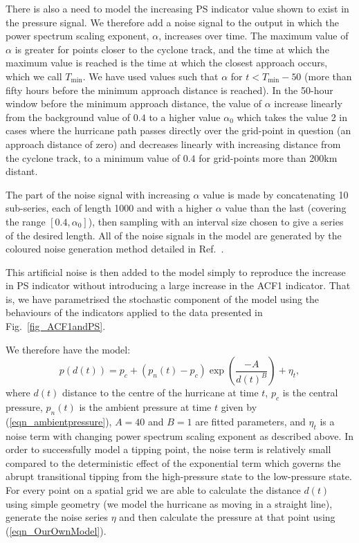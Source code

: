\documentclass[%
aip,
amsmath,amssymb,
reprint,%
]{revtex4-1}
\newcommand{\newNote}[1]{{#1}}
\begin{document}
There is also a need to model the increasing PS indicator value shown to exist in the pressure signal. We therefore add a noise signal to the output in which the power spectrum scaling exponent, $\alpha$, increases over time. The maximum value of $\alpha$ is greater for points closer to the cyclone track, and the time at which the maximum value is reached is the time at which the closest approach occurs, which we call $T_{\min}$. We have used values  {\newNote such that $\alpha$ for $t<T_{\min}-50$ (more than fifty hours before the minimum approach distance is reached). In the 50-hour window before the minimum approach distance, the value of $\alpha$ increase linearly from the background value of $0.4$ to a higher value $\alpha_0$ which takes the value 2 in cases where the hurricane path passes directly over the grid-point in question (an approach distance of zero) and decreases linearly with increasing distance from the cyclone track, to a minimum value of $0.4$ for grid-points more than 200km distant.}

The part of the noise signal with increasing $\alpha$ value is made by concatenating 10 sub-series, each of length 1000 and with a higher $\alpha$ value than the last (covering the range $[0.4, \alpha_0]$), then sampling with an interval size chosen to give a series of the desired length. All of the noise signals in the model are generated by the coloured noise generation method detailed in Ref.~. 

 This artificial noise is then added to the model simply to reproduce the increase in PS indicator without introducing a large increase in the ACF1 indicator. That is, we have parametrised the stochastic component of the model using the behaviours of the indicators applied to the data presented in Fig.~\ref{fig_ACF1andPS}.

We therefore have the model:
\begin{equation}
p(d(t)) = p_c + (p_n(t)-p_c)\exp\left( \frac{-A}{d(t)^B} \right) + \eta_t,
\label{eqn_OurOwnModel}
\end{equation} 
where $d(t)$ distance to the centre of the hurricane at time $t$, $p_c$ is the central pressure, $p_n(t)$ is the ambient pressure at time $t$ given by (\ref{eqn_ambientpressure}), $A=40$ and $B=1$ are fitted parameters, and $\eta_t$ is a noise term with changing power spectrum scaling exponent as described above. {\newNote In order to successfully model a tipping point\cite{scheffer2009,kuehn2011mathematical}, the noise term is relatively small compared to the deterministic effect of the exponential term which governs the abrupt transitional tipping\cite{livina2011} from the high-pressure state to the low-pressure state.} For every point on a spatial grid we are able to calculate the distance $d(t)$ using simple geometry (we model the hurricane as moving in a straight line), generate the noise series $\eta$ and then calculate the pressure at that point using (\ref{eqn_OurOwnModel}). 
\end{document}
